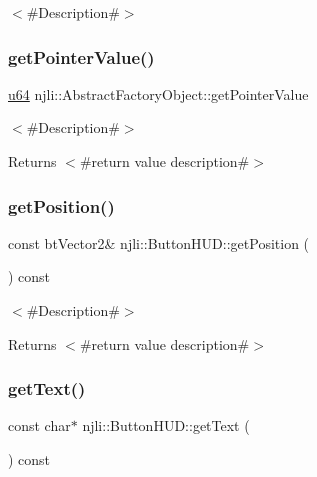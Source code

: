 $<$\#\+Description\#$>$ \mbox{\label{classnjli_1_1_button_h_u_d_a4ffddf141a426a5a07d0ac19f1913811}} 
\subsubsection{\texorpdfstring{get\+Pointer\+Value()}{getPointerValue()}}
{\footnotesize\ttfamily \mbox{\hyperlink{_util_8h_ad758b7a5c3f18ed79d2fcd23d9f16357}{u64}} njli\+::\+Abstract\+Factory\+Object\+::get\+Pointer\+Value}

$<$\#\+Description\#$>$

\begin{DoxyReturn}{Returns}
$<$\#return value description\#$>$ 
\end{DoxyReturn}
\mbox{\label{classnjli_1_1_button_h_u_d_aa421a6d2aa947e9085fcf2341d0f053e}} 
\subsubsection{\texorpdfstring{get\+Position()}{getPosition()}}
{\footnotesize\ttfamily const bt\+Vector2\& njli\+::\+Button\+H\+U\+D\+::get\+Position (\begin{DoxyParamCaption}{ }\end{DoxyParamCaption}) const}

$<$\#\+Description\#$>$

\begin{DoxyReturn}{Returns}
$<$\#return value description\#$>$ 
\end{DoxyReturn}
\mbox{\label{classnjli_1_1_button_h_u_d_a0861390deacc178bb5d8d3f5795f2257}} 
\subsubsection{\texorpdfstring{get\+Text()}{getText()}}
{\footnotesize\ttfamily const char$\ast$ njli\+::\+Button\+H\+U\+D\+::get\+Text (\begin{DoxyParamCaption}{ }\end{DoxyParamCaption}) const}


